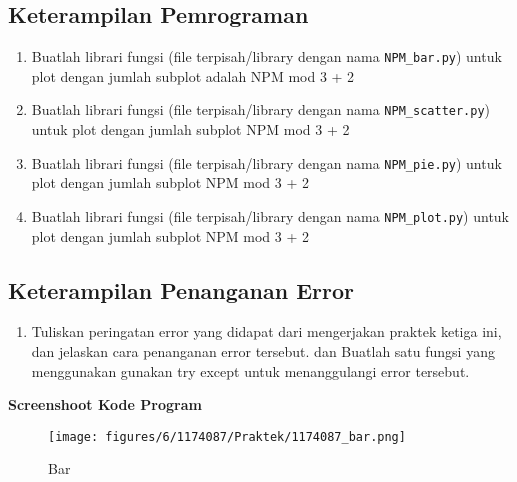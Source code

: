 \subsection{Keterampilan Pemrograman}
\begin{enumerate}
\item Buatlah librari fungsi (file terpisah/library dengan nama \verb|NPM_bar.py|) untuk plot dengan jumlah subplot adalah NPM mod 3 + 2

	
	
\item Buatlah librari fungsi (file terpisah/library dengan nama \verb|NPM_scatter.py|) untuk plot dengan jumlah subplot NPM mod 3 + 2

	

\item Buatlah librari fungsi (file terpisah/library dengan nama \verb|NPM_pie.py|) untuk plot dengan jumlah subplot NPM mod 3 + 2

	
	
\item  Buatlah librari fungsi (file terpisah/library dengan nama \verb|NPM_plot.py|) untuk plot dengan jumlah subplot NPM mod 3 + 2

	
	 
\end{enumerate}

\subsection{Keterampilan Penanganan Error}
\begin{enumerate}
\item Tuliskan peringatan error yang didapat dari mengerjakan praktek ketiga ini, dan jelaskan cara penanganan error tersebut. dan Buatlah satu fungsi yang menggunakan gunakan try except untuk menanggulangi error tersebut.

	

\end{enumerate}

\textbf{Screenshoot Kode Program}
\begin{figure}[ht]	
    \texttt{[image: figures/6/1174087/Praktek/1174087\_bar.png]}
    \centering
    \caption{Bar}
\end{figure}

